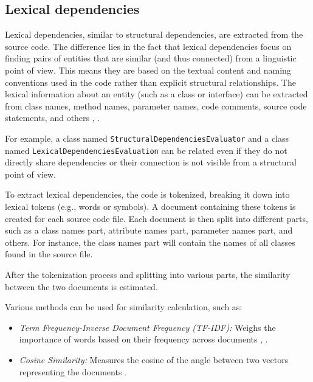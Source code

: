 \subsection{Lexical dependencies}

\hspace{4em}Lexical dependencies, similar to structural dependencies, are extracted from the source code. The difference lies in the fact that lexical dependencies focus on finding pairs of entities that are similar (and thus connected) from a linguistic point of view. This means they are based on the textual content and naming conventions used in the code rather than explicit structural relationships. The lexical information about an entity (such as a class or interface) can be extracted from class names, method names, parameter names, code comments, source code statements, and others \cite{lexical-dep}, \cite{lexical-dep-Prajapati}.

For example, a class named \texttt{StructuralDependenciesEvaluator} and a class named \texttt{LexicalDependenciesEvaluation} can be related even if they do not directly share dependencies or their connection is not visible from a structural point of view.

To extract lexical dependencies, the code is tokenized, breaking it down into lexical tokens (e.g., words or symbols). A document containing these tokens is created for each source code file. Each document is then split into different parts, such as a class names part, attribute names part, parameter names part, and others. For instance, the class names part will contain the names of all classes found in the source file.

After the tokenization process and splitting into various parts, the similarity between the two documents is estimated. 

Various methods can be used for similarity calculation, such as:
\begin{itemize}
    \item \textit{Term Frequency-Inverse Document Frequency (TF-IDF):} Weighs the importance of words based on their frequency across documents \cite{lexical-dep}, \cite{lexical-dep-Corazza}.
    \item \textit{Cosine Similarity:} Measures the cosine of the angle between two vectors representing the documents \cite{lexical-dep-Prajapati}.
\end{itemize}






